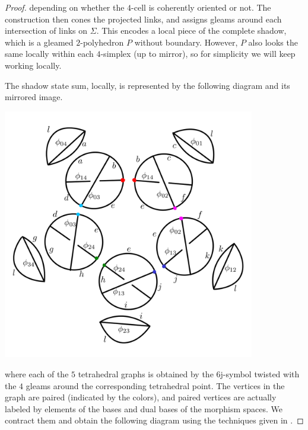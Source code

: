 \begin{proof}
  \noindent depending on whether the $4$-cell is coherently
  oriented or not. The construction then cones the projected
  links, and assigns gleams around each intersection of links on
  $\Sigma$. This encodes a local piece of the complete shadow,
  which is a gleamed $2$-polyhedron $P$ without boundary.
  However, $P$ also looks the same locally within each
  $4$-simplex (up to mirror), so for simplicity we will keep
  working locally.

  The shadow state sum, locally, is represented by the following
  diagram and its mirrored image.

  \begin{center}
    \includegraphics[height=11cm]{main-shadow-state-sum-1}
  \end{center}

  \noindent where each of the $5$ tetrahedral graphs is obtained
  by the $6$j-symbol twisted with the $4$ gleams around the
  corresponding tetrahedral point. The vertices in the graph are
  paired (indicated by the colors), and paired vertices are
  actually labeled by elements of the bases and dual bases of the
  morphism spaces. We contract them and obtain the following
  diagram using the techniques given in
  \cite[Lemma 1.1, 1.3]{kirillov-balsam/turaev-viro-I}.


\end{proof}
